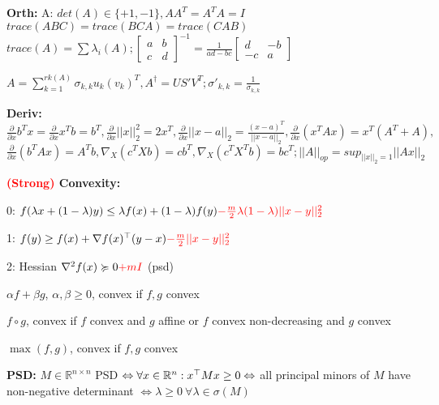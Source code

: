 \textbf{Orth:} A: $det(A)\in\{+1,-1\},AA^T=A^TA=I$\\
\(trace(ABC) = trace(BCA) = trace(CAB)\)\\ 
\(trace(A)=\sum \lambda_i(A);
\begin{bmatrix}
a&b \\ 
c&d
\end{bmatrix}^{-1}=\frac{1}{ad-bc}
\begin{bmatrix}
d&-b \\ 
-c&a
\end{bmatrix}
\)

\(A=\sum_{k=1}^{rk(A)}\sigma_{k,k}u_k (v_k)^T, A^\dag = U S' V^T; \sigma'_{k, k} = \frac{1}{\sigma_{k,k}}\)

\textbf{Deriv:}
$\frac{\partial}{\partial x}b^Tx=\frac{\partial}{\partial x}x^Tb=b^T,\!
\frac{\partial}{\partial x}||x||_2^2=2x^T,\! \frac{\partial}{\partial x} ||x -a||_2 = \frac{(x-a)^T}{||x-a||_2},\!
\frac{\partial}{\partial x}(x^TAx)=x^T(A^T+A),$
$\frac{\partial}{\partial x}(b^TAx)=A^Tb, \nabla_X(c^TXb)=cb^T,
\nabla_X(c^TX^Tb)=bc^T; ||A||_{op} = sup_{||x||_2=1}||Ax||_2$


\textbf{\textcolor{red}{(Strong)} Convexity:}

0: $f(\lambda x + (1 - \lambda)y) \leq \lambda f(x) + (1- \lambda) f(y) \textcolor{red}{-\frac{m}{2} \lambda (1-\lambda) ||x-y||_2^2}$

1: $f(y) \geq f(x) + \nabla f(x)^\top (y - x) \textcolor{red}{-\frac{m}{2} ||x-y||_2^2}$

2: Hessian $\nabla^2 f (x) \succcurlyeq 0 \textcolor{red}{+ m I}$ (psd)

\begin{rowlist}
	\item $\alpha f + \beta g$, $\alpha, \beta \geq 0$, convex if $f, g$ convex
	\item $f \circ g$, convex if $f$ convex and $g$ affine or $f$ convex non-decreasing and $g$ convex
	\item $\max(f, g)$, convex if $f,g$ convex
\end{rowlist}

\textbf{PSD:}
$M \in \mathbb{R}^{n\times n}$ PSD $\Leftrightarrow \forall x \in \mathbb{R}^n: x^\top Mx \geq 0 \\
\Leftrightarrow$ all principal minors of $M$ have non-negative determinant $\Leftrightarrow \lambda \geq 0 \ \forall \lambda\in\sigma(M)$

